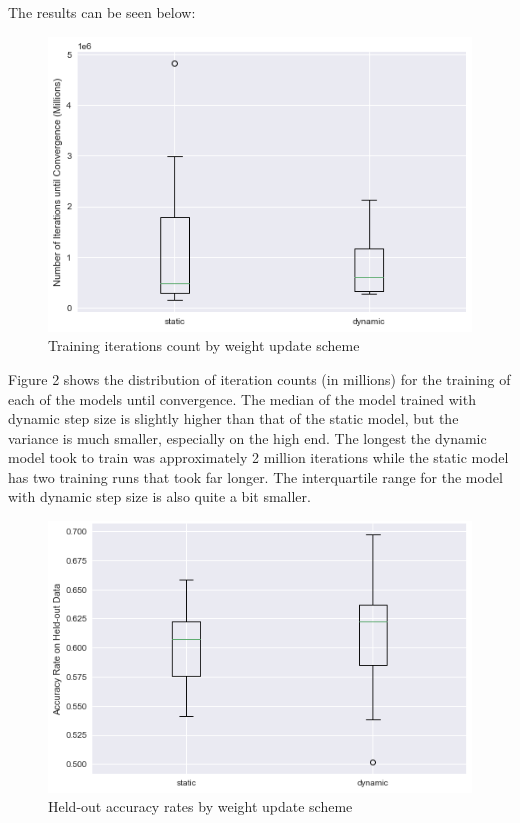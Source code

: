 \documentclass[12pt]{article}
\begin{document}
The results can be seen below:

\begin{figure}[h!]
\begin{center}
  \includegraphics[scale=0.7]{images/iter_counts.png}
  \caption{Training iterations count by weight update scheme}
  \label{fig:2}
\end{center}
\end{figure}

Figure 2 shows the distribution of iteration counts (in millions) for the training of each of the models until convergence. The median of the model trained with dynamic step size is slightly higher than that of the static model, but the variance is much smaller, especially on the high end. The longest the dynamic model took to train was approximately 2 million iterations while the static model has two training runs that took far longer. The interquartile range for the model with dynamic step size is also quite a bit smaller.

\begin{figure}[h!]
\begin{center}
  \includegraphics[scale=0.7]{images/accuracy_rates.png}
  \caption{Held-out accuracy rates by weight update scheme}
  \label{fig:3}
\end{center}
\end{figure}
\end{document}

